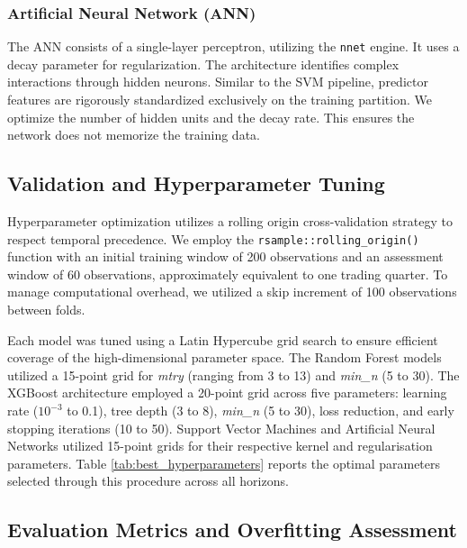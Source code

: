 \documentclass[12pt]{article}
\begin{document}
\subsubsection{Artificial Neural Network (ANN)}
The ANN consists of a single-layer perceptron, utilizing the \texttt{nnet} engine. It uses a decay parameter for regularization. The architecture identifies complex interactions through hidden neurons. Similar to the SVM pipeline, predictor features are rigorously standardized exclusively on the training partition. We optimize the number of hidden units and the decay rate. This ensures the network does not memorize the training data.

\subsection{Validation and Hyperparameter Tuning}

Hyperparameter optimization utilizes a rolling origin cross-validation strategy to respect temporal precedence. We employ the \texttt{rsample::rolling\_origin()} function with an initial training window of 200 observations and an assessment window of 60 observations, approximately equivalent to one trading quarter. To manage computational overhead, we utilized a skip increment of 100 observations between folds. 

Each model was tuned using a Latin Hypercube grid search to ensure efficient coverage of the high-dimensional parameter space. The Random Forest models utilized a 15-point grid for \textit{mtry} (ranging from 3 to 13) and \textit{min\_n} (5 to 30). The XGBoost architecture employed a 20-point grid across five parameters: learning rate ($10^{-3}$ to 0.1), tree depth (3 to 8), \textit{min\_n} (5 to 30), loss reduction, and early stopping iterations (10 to 50). Support Vector Machines and Artificial Neural Networks utilized 15-point grids for their respective kernel and regularisation parameters. Table \ref{tab:best_hyperparameters} reports the optimal parameters selected through this procedure across all horizons.



\subsection{Evaluation Metrics and Overfitting Assessment}
\end{document}

